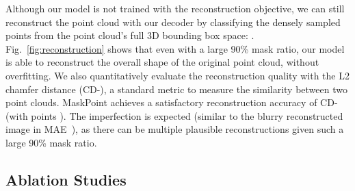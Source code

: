 \documentclass[runningheads]{llncs}
\begin{document}
Although our model is not trained with the reconstruction objective, we can still reconstruct the point cloud with our decoder by classifying the densely sampled points from the point cloud's full 3D bounding box space: .
Fig.~\ref{fig:reconstruction} shows that even with a large 90\% mask ratio, our model is able to reconstruct the overall shape of the original point cloud, without overfitting.
We also quantitatively evaluate the reconstruction quality with the L2 chamfer distance (CD-), a standard metric to measure the similarity between two point clouds.  MaskPoint achieves a satisfactory reconstruction accuracy of  CD- (with points ).
The imperfection is expected (similar to the blurry reconstructed image in MAE~\cite{mae}), as there can be multiple plausible reconstructions given such a large 90\% mask ratio.

\subsection{Ablation Studies}
\end{document}
